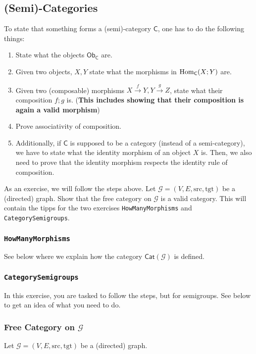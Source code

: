 \subsection{(Semi)-Categories}
To state that something forms a (semi)-category $\textsf{C}$, one has to do the following things:
\begin{enumerate}
  \item State what the objects $\textsf{Ob}_{\textsf{C}}$ are.
  \item Given two objects, $X,Y$ state what the morphisms in $\operatorname{Hom}_{\textsf{C}}(X;Y)$ are.
  \item Given two (composable) morphisms $X \stackrel{f}{\to} Y, Y \stackrel{g}{\to}Z$, state what their composition $f;g$ is. (\textbf{This includes showing that their composition is again a valid morphism})
  \item Prove associativity of composition.
  \item Additionally, if $\textsf{C}$ is supposed to be a category (instead of a semi-category), we have to state what the identity morphism of an object $X$ is.
    Then, we also need to prove that the identity morphism respects the identity rule of composition.
\end{enumerate}
As an exercise, we will follow the steps above.
Let $\mathcal{G} = (V,E,\text{src},\text{tgt})$ be a (directed) graph. 
Show that the free category on $\mathcal{G}$ is a valid category.
This will contain the tipps for the two exercises \texttt{HowManyMorphisms} and \texttt{CategorySemigroups}.

\subsubsection{\texttt{HowManyMorphisms}}
See below where we explain how the category $\textsf{Cat}(\mathcal{G})$ is defined.

\subsubsection{\texttt{CategorySemigroups}}
In this exercise, you are tasked to follow the steps, but for semigroups. See below to get an idea of what you need to do.


\subsubsection{Free Category on $\mathcal{G}$}
Let $\mathcal{G} = (V,E,\text{src},\text{tgt})$ be a (directed) graph. 

